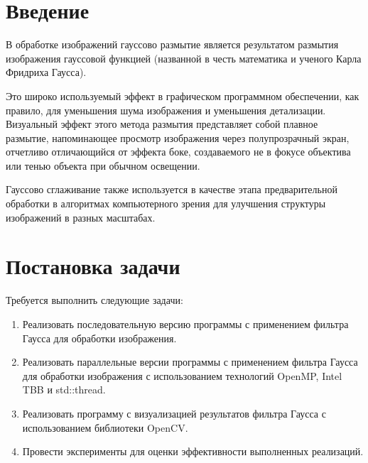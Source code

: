 \documentclass{report}
\begin{document}
\setcounter{page}{2}

\tableofcontents
\newpage

\section*{Введение}
\par В обработке изображений гауссово размытие является результатом размытия изображения гауссовой функцией (названной в честь математика и ученого Карла Фридриха Гаусса).
\par Это широко используемый эффект в графическом программном обеспечении, как правило, для уменьшения шума изображения и уменьшения детализации. Визуальный эффект этого метода размытия представляет собой плавное размытие, напоминающее просмотр изображения через полупрозрачный экран, отчетливо отличающийся от эффекта боке, создаваемого не в фокусе объектива или тенью объекта при обычном освещении.
\par Гауссово сглаживание также используется в качестве этапа предварительной обработки в алгоритмах компьютерного зрения для улучшения структуры изображений в разных масштабах.
\newpage

\section*{Постановка задачи}
\par Требуется выполнить следующие задачи:
\begin{enumerate}
    \item Реализовать последовательную версию программы с применением фильтра Гаусса для обработки изображения.
    \item Реализовать параллельные версии программы с применением фильтра Гаусса для обработки изображения с использованием технологий OpenMP, Intel TBB и std::thread.
    \item Реализовать программу с визуализацией результатов фильтра Гаусса с использованием библиотеки OpenCV.
    \item Провести эксперименты для оценки эффективности выполненных реализаций.
\end{enumerate}
\par 
\newpage

\end{document}
